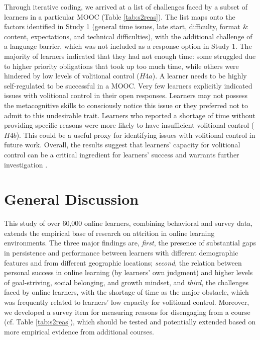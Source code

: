 \documentclass{sigchi}\usepackage[]{graphicx}\usepackage[]{color}
\begin{document}
Through iterative coding, we arrived at a list of challenges faced by a subset of learners in a particular MOOC (Table \ref{tab:s2reas}). The list maps onto the factors identified in Study 1 (general time issues, late start, difficulty, format \& content, expectations, and technical difficulties), with the additional challenge of a language barrier, which was not included as a response option in Study 1. The majority of learners indicated that they had not enough time: some struggled due to higher priority obligations that took up too much time, while others were hindered by low levels of volitional control ($H4a$). A learner needs to be highly self-regulated to be successful in a MOOC. Very few learners explicitly indicated issues with volitional control in their open responses. Learners may not possess the metacognitive skills to consciously notice this issue or they preferred not to admit to this undesirable trait. Learners who reported a shortage of time without providing specific reasons were more likely to have insufficient volitional control ($H4b$). This could be a useful proxy for identifying issues with volitional control in future work. Overall, the results suggest that learners' capacity for volitional control can be a critical ingredient for learners' success and warrants further investigation \cite{corno2001volitional}.


\section{General Discussion}

This study of over 60,000 online learners, combining behavioral and survey data, extends the empirical base of research on attrition in online learning environments. The three major findings are, \emph{first}, the presence of substantial gaps in persistence and performance between learners with different demographic features and from different geographic locations; \emph{second}, the relation between personal success in online learning (by learners' own judgment) and higher levels of goal-striving, social belonging, and growth mindset, and \emph{third}, the challenges faced by online learners, with the shortage of time as the major obstacle, which was frequently related to learners' low capacity for volitional control. Moreover, we developed a survey item for measuring reasons for disengaging from a course (cf. Table \ref{tab:s2reas}), which should be tested and potentially extended based on more empirical evidence from additional courses.
\end{document}
